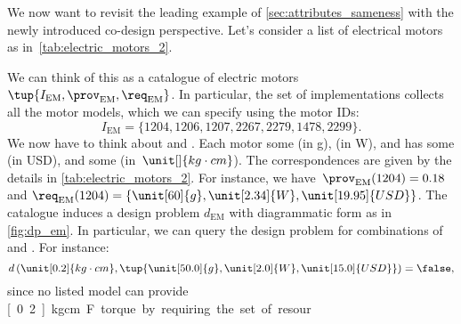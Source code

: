 \begin{example}
We now want to revisit the leading example of \cref{sec:attributes_sameness} with the newly introduced co-design perspective. Let's consider a list of electrical motors as in~\cref{tab:electric_motors_2}.
\begin{table}[h]
    \centering
    \caption{A simplified catalogue of motors.}
    \label{tab:electric_motors_2}
\end{table}

We can think of this as a catalogue of electric motors~$\tup{I_\mathrm{EM},\prov_\mathrm{EM},\req_\mathrm{EM}}$. In particular, the set of implementations collects all the motor models, which we can specify using the motor IDs:
\begin{equation}
    I_\mathrm{EM}=\{1204,1206,1207,2267,2279,1478,2299 \}.
\end{equation}
We now have to think about  and . Each motor  some  (in \unit[]{g}),  (in \unit[]{W}), and has some  (in USD), and  some  (in~$\unit[]{kg\cdot cm}$). The correspondences are given by the details in \cref{tab:electric_motors_2}. For instance, we have~$\prov_\mathrm{EM}(1204)=0.18$ and $\req_\mathrm{EM}(1204)=\{\unit[60]{g},\unit[2.34]{W},\unit[19.95]{USD}\}$. The catalogue induces a design problem $d_\mathrm{EM}$ with diagrammatic form as in \cref{fig:dp_em}. In particular, we can query the design problem for combinations of  and . For instance:
\begin{equation}
    d\left(\unit[0.2]{kg\cdot cm}, \tup{\unit[50.0]{g},\unit[2.0]{W},\unit[15.0]{USD}} \right)=\false,
\end{equation}
since no listed model can provide \unit[0.2]{kg\cdot cm} \F{torque} by requiring the set of resour


\end{example}
